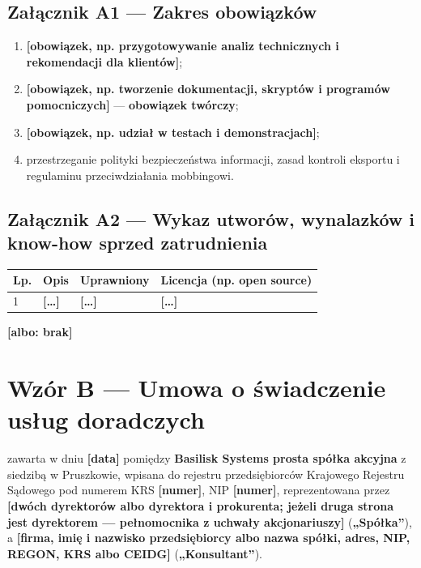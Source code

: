 \documentclass[11pt,a4paper]{report}
\newcounter{paragraf}
\newcommand{\field}[1]{\textbf{[#1]}}
\newcommand{\CompanyFull}{Basilisk Systems prosta spółka akcyjna}
\newcommand{\Strony}{\textbf{\CompanyFull{}} z siedzibą w Pruszkowie, wpisana do rejestru przedsiębiorców Krajowego Rejestru Sądowego pod numerem KRS \field{numer}, NIP \field{numer}, reprezentowana przez \field{dwóch dyrektorów albo dyrektora i prokurenta; jeżeli druga strona jest dyrektorem --- pełnomocnika z uchwały akcjonariuszy}}
\begin{document}
\section*{Załącznik A1 --- Zakres obowiązków}
\begin{enumerate}
  \item \field{obowiązek, np. przygotowywanie analiz technicznych i rekomendacji dla klientów};
  \item \field{obowiązek, np. tworzenie dokumentacji, skryptów i programów pomocniczych} --- \textbf{obowiązek twórczy};
  \item \field{obowiązek, np. udział w testach i demonstracjach};
  \item przestrzeganie polityki bezpieczeństwa informacji, zasad kontroli eksportu i regulaminu przeciwdziałania mobbingowi.
\end{enumerate}

\section*{Załącznik A2 --- Wykaz utworów, wynalazków i know-how sprzed zatrudnienia}
\begin{center}
\begin{tabularx}{\linewidth}{@{}p{0.8cm} X p{3.4cm} p{3.4cm}@{}}
\toprule
\textbf{Lp.} & \textbf{Opis} & \textbf{Uprawniony} & \textbf{Licencja (np. open source)} \\
\midrule
1 & \field{\ldots} & \field{\ldots} & \field{\ldots} \\
\bottomrule
\end{tabularx}
\end{center}
\field{albo: brak}

\chapter*{Wzór B --- Umowa o świadczenie usług doradczych}
\setcounter{paragraf}{0}

zawarta w dniu \field{data} pomiędzy \Strony{} (\textbf{„Spółka”}), a \field{firma, imię i nazwisko przedsiębiorcy albo nazwa spółki, adres, NIP, REGON, KRS albo CEIDG} (\textbf{„Konsultant”}).
\end{document}
